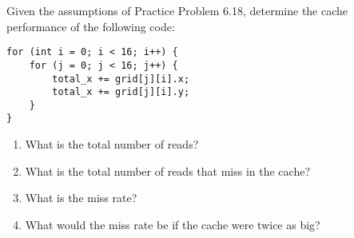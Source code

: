 \documentclass[12pt]{article}
\newenvironment{ex}[2][Exercise]{\begin{trivlist}
		\item[\hskip \labelsep {\bfseries #1}\hskip \labelsep {\bfseries #2.}]}{\end{trivlist}}
\begin{document}
\begin{ex}{6.19}
	Given the assumptions of Practice Problem 6.18, determine the cache performance of the
	following code:
	\begin{lstlisting}
for (int i = 0; i < 16; i++) {
	for (j = 0; j < 16; j++) {
		total_x += grid[j][i].x;
		total_x += grid[j][i].y;
	}
}
	\end{lstlisting}
	\begin{enumerate}[label=(\alph*)]
		\item What is the total number of reads?
		\item What is the total number of reads that miss in the cache?
		\item What is the miss rate?
		\item What would the miss rate be if the cache were twice as big?
	\end{enumerate}
\end{ex}
\end{document}

